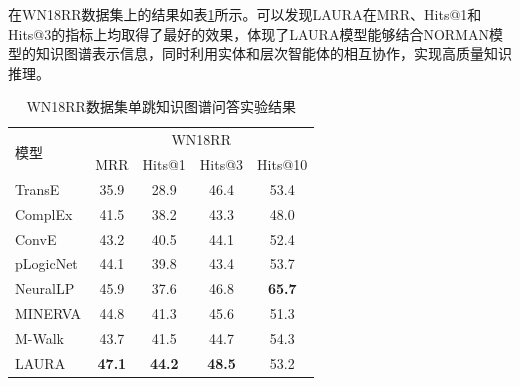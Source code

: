 \documentclass[algorithmlist, AutoFakeBold, AutoFakeSlant, figurelist, tablelist, nomlist, engineering]{seuthesix}
\begin{document}
在WN18RR数据集上的结果如表\ref{Experiment2_WN18RR}所示。可以发现LAURA在MRR、Hits@1和Hits@3的指标上均取得了最好的效果，体现了LAURA模型能够结合NORMAN模型的知识图谱表示信息，同时利用实体和层次智能体的相互协作，实现高质量知识推理。
\begin{table}[]
  \centering
  \begin{tabular*}{0.95\textwidth}{@{\extracolsep{\fill}}lcccc}
  \toprule[1pt]
  \multirow{2}{*}{模型} & \multicolumn{4}{c}{WN18RR}   \\
    & MRR & Hits@1 & Hits@3 & Hits@10 \\ \hline
  TransE & 35.9 & 28.9 & 46.4 & 53.4 \\
  ComplEx & 41.5 & 38.2 & 43.3 & 48.0 \\
  ConvE & 43.2 & 40.5 & 44.1 & 52.4 \\
  pLogicNet & 44.1 & 39.8 & 43.4 & 53.7 \\
  NeuralLP & 45.9 & 37.6 & 46.8 & \textbf{65.7} \\
  MINERVA & 44.8 & 41.3 & 45.6 & 51.3 \\
  M-Walk & 43.7 & 41.5 & 44.7 & 54.3 \\
  LAURA & \textbf{47.1} & \textbf{44.2} & \textbf{48.5} & 53.2 \\
  \bottomrule[1pt]
  \end{tabular*}
  \caption{WN18RR数据集单跳知识图谱问答实验结果}
  \label{Experiment2_WN18RR}
\end{table}
\end{document}
